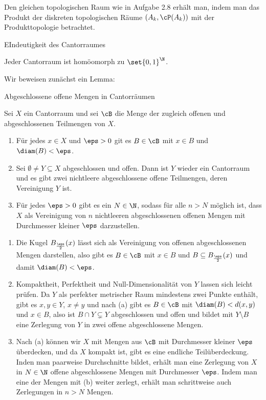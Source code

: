 \begin{bemerkung}
  Den gleichen topologischen Raum wie in Aufgabe 2.8 erhält man, indem man das Produkt der diskreten topologischen Räume $(A_k, \cP(A_k))$ mit der Produkttopologie betrachtet.  
\end{bemerkung}
\begin{satz} EIndeutigkeit des Cantorraumes
 
  Jeder Cantorraum ist homöomorph zu $\set {0, 1}^\N$.
\end{satz}
Wir beweisen zunächst ein Lemma:
\begin{lemma} Abgeschlossene offene Mengen in Cantorräumen

Sei $X$ ein Cantorraum und sei $\cB$ die Menge der zugleich offenen und abgeschlossenen Teilmengen von $X$. 
\renewcommand{\labelenumi}{(\alph{enumi})}
\begin{enumerate}
\item Für jedes $x \in X$ und $\eps >0$ git es $B \in \cB$ mit $x \in B$ und $\diam(B)< \eps$.
\item Sei $\emptyset \neq Y \subseteq X$ abgeschlossen und offen. Dann ist $Y$ wieder ein Cantorraum und es gibt zwei nichtleere abgeschlossene offene Teilmengen, deren Vereinigung $Y$ ist.
\item Für jedes $\eps > 0$ gibt es ein $N \in \N$, sodass für alle $n > N$ möglich ist, dass $X$ als Vereinigung von $n$ nichtleeren abgeschlossenen offenen Mengen mit Durchmesser kleiner $\eps$ darzustellen. 
\end{enumerate}
\end{lemma}
\begin{beweis}
  \enu{\alph}
  \begin{enumerate}
  \item Die Kugel $B_{\frac \eps 2}(x)$ lässt sich als Vereinigung von offenen abgeschlossenen Mengen darstellen, also gibt es $B \in \cB$ mit $x \in B$ und $B \subseteq B_{\frac \eps 2}(x)$ und damit $\diam(B)< \eps$.
  \item Kompaktheit, Perfektheit und Null-Dimensionalität von $Y$ lassen sich leicht prüfen. Da $Y$ als perfekter metrischer Raum mindestens zwei Punkte enthält, gibt es $x, y \in Y$, $x \neq y$ und nach (a) gibt es $B \in \cB$ mit $\diam(B)< d(x, y)$ und $x \in B$, also ist $B \cap Y  \subsetneq Y$ abgeschlossen und offen und bildet mit $Y \setminus B$ eine Zerlegung von $Y$ in zwei offene abgeschlossene Mengen.
\item Nach (a) können wir $X$ mit Mengen aus $\cB$ mit Durchmesser kleiner $\eps$ überdecken, und da $X$ kompakt ist, gibt es eine endliche Teilüberdeckung. Inden man paarweise Durchschnitte bildet, erhält man eine Zerlegung von $X$ in $N \in \N$ offene abgeschlossene Mengen mit Durchmesser $\eps$. Indem man eine der Mengen mit (b) weiter zerlegt, erhält man schrittweise auch Zerlegungen in $n > N$ Mengen.
\end{enumerate}
\end{beweis}
